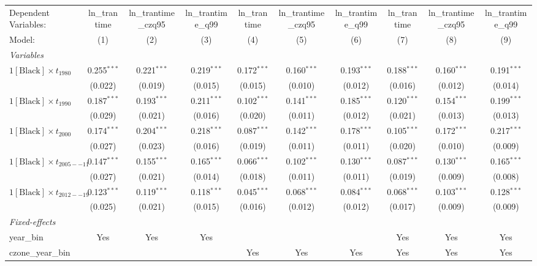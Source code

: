 \begin{tabular}{lccccccccc}
\tabularnewline\midrule\midrule
Dependent Variables:&ln\_trantime&ln\_trantime\_czq95&ln\_trantime\_q99&ln\_trantime&ln\_trantime\_czq95&ln\_trantime\_q99&ln\_trantime&ln\_trantime\_czq95&ln\_trantime\_q99\\
Model:&(1) & (2) & (3) & (4) & (5) & (6) & (7) & (8) & (9)\\
\midrule \emph{Variables}&   &   &   &   &   &   &   &   &  \\
$1[\text{Black}] \times t_{1980}$ & 0.255$^{***}$ & 0.221$^{***}$ & 0.219$^{***}$ & 0.172$^{***}$ & 0.160$^{***}$ & 0.193$^{***}$ & 0.188$^{***}$ & 0.160$^{***}$ & 0.191$^{***}$\\
  &(0.022) & (0.019) & (0.015) & (0.015) & (0.010) & (0.012) & (0.016) & (0.012) & (0.014)\\
$1[\text{Black}] \times t_{1990}$ & 0.187$^{***}$ & 0.193$^{***}$ & 0.211$^{***}$ & 0.102$^{***}$ & 0.141$^{***}$ & 0.185$^{***}$ & 0.120$^{***}$ & 0.154$^{***}$ & 0.199$^{***}$\\
  &(0.029) & (0.021) & (0.016) & (0.020) & (0.011) & (0.012) & (0.021) & (0.013) & (0.013)\\
$1[\text{Black}] \times t_{2000}$ & 0.174$^{***}$ & 0.204$^{***}$ & 0.218$^{***}$ & 0.087$^{***}$ & 0.142$^{***}$ & 0.178$^{***}$ & 0.105$^{***}$ & 0.172$^{***}$ & 0.217$^{***}$\\
  &(0.027) & (0.023) & (0.016) & (0.019) & (0.011) & (0.011) & (0.020) & (0.010) & (0.009)\\
$1[\text{Black}] \times t_{2005--11}$ & 0.147$^{***}$ & 0.155$^{***}$ & 0.165$^{***}$ & 0.066$^{***}$ & 0.102$^{***}$ & 0.130$^{***}$ & 0.087$^{***}$ & 0.130$^{***}$ & 0.165$^{***}$\\
  &(0.027) & (0.021) & (0.014) & (0.018) & (0.011) & (0.011) & (0.019) & (0.009) & (0.008)\\
$1[\text{Black}] \times t_{2012--19}$ & 0.123$^{***}$ & 0.119$^{***}$ & 0.118$^{***}$ & 0.045$^{***}$ & 0.068$^{***}$ & 0.084$^{***}$ & 0.068$^{***}$ & 0.103$^{***}$ & 0.128$^{***}$\\
  &(0.025) & (0.021) & (0.015) & (0.016) & (0.012) & (0.012) & (0.017) & (0.009) & (0.009)\\
\midrule \emph{Fixed-effects}&   &   &   &   &   &   &   &   &  \\
year\_bin & Yes & Yes & Yes &  &  &  & Yes & Yes & Yes\\
czone\_year\_bin &  &  &  & Yes & Yes & Yes & Yes & Yes & Yes\\

\end{tabular}
